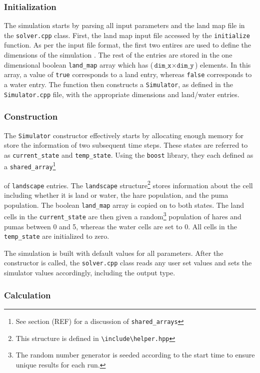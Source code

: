 \documentclass[a4paper,11pt]{article}
\begin{document}
{\subsubsection{Initialization}

The simulation starts by parsing all input parameters and the land map file in the \texttt{solver.cpp} class.  First, the land map input file accessed by the \texttt{initialize} function.  As per the input file format, the first two entires are used to define the dimensions of the simulation .  The rest of the entries are stored in the one dimensional boolean \texttt{land\_map} array which has ($\texttt{dim\_x} \times \texttt{dim\_y}$) elements.  In this array, a value of \texttt{true} corresponds to a land entry, whereas \texttt{false} corresponds to a water entry.  The function then constructs a \texttt{Simulator}, as defined in the \texttt{Simulator.cpp} file, with the appropriate dimensions and land/water entries.  

\subsubsection{Construction}

The \texttt{Simulator} constructor effectively starts by allocating enough memory for store the information of two subsequent time steps.  These states are  referred to as \texttt{current\_state} and \texttt{temp\_state}.  Using the \texttt{boost} library, they each defined as a \texttt{shared\_array}\footnote{See section (REF) for a discussion of \texttt{shared\_arrays}}} of \texttt{landscape} entries.  The \texttt{landscape} structure\footnote{This structure is defined in \texttt{\textbackslash include\textbackslash helper.hpp}} stores information about the cell including whether it is land or water, the hare population, and the puma population. The boolean \texttt{land\_map} array is copied on to both states.  The land cells in the \texttt{current\_state} are then given a random\footnote{The random number generator is seeded according to the start time to ensure unique results for each run.} population of hares and pumas between 0 and 5, whereas the water cells are set to 0.  All cells in the \texttt{temp\_state} are initialized to zero.

The simulation is built with default values for all parameters.  After the constructor is called, the \texttt{solver.cpp} class reads any user set values and sets the simulator values accordingly, including the output type.

\subsubsection{Calculation}
\end{document}
